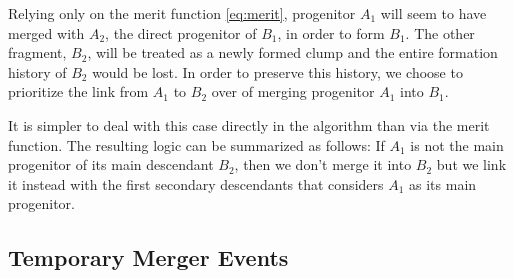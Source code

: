 \documentclass[a4paper,twocolumn,fleqn,usenatbib]{mnras}
\begin{document}
Relying only on the merit function \eqref{eq:merit}, progenitor $A_1$
will seem to have merged with $A_2$, the direct progenitor of $B_1$,
in order to form $B_1$.  The other fragment, $B_2$, will be treated as
a newly formed clump and the entire formation history of $B_2$ would
be lost. In order to preserve this history, we choose to prioritize the 
link from $A_1$ to $B_2$ over of merging progenitor $A_1$ into $B_1$.


It is simpler to deal with this case directly in the algorithm
than via the merit function. The resulting logic can be summarized as
follows: If $A_1$ is not the main progenitor of its main descendant
$B_2$, then we don't merge it into $B_2$ but we link it instead with
the first secondary descendants that considers $A_1$ as its
main progenitor.


\subsection{Temporary Merger Events}
\label{sect:jumpers}
\end{document}
